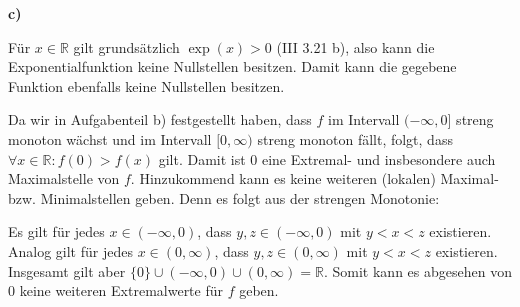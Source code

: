 \documentclass[a4paper,graphics,11pt]{article}
\begin{document}
\textbf{c)}

Für $x \in \mathbb{R}$ gilt grundsätzlich $\exp(x) > 0$ (III 3.21 b), also kann die
Exponentialfunktion keine Nullstellen besitzen. Damit kann die gegebene Funktion
ebenfalls keine Nullstellen besitzen.

Da wir in Aufgabenteil b) festgestellt haben, dass $f$ im Intervall $(-\infty, 0]$
streng monoton wächst und im Intervall $[0, \infty)$ streng monoton fällt, folgt,
dass $\forall x \in \mathbb{R}\colon f(0) > f(x)$ gilt. Damit ist 0 eine Extremal-
und insbesondere auch Maximalstelle von $f$. Hinzukommend kann es keine weiteren
(lokalen) Maximal- bzw. Minimalstellen geben. Denn es folgt aus der strengen Monotonie:

Es gilt für jedes $x \in (-\infty, 0)$, dass $y, z \in (-\infty, 0)$ mit $y<x<z$ existieren.
Analog gilt für jedes $x \in (0, \infty)$, dass $y,z \in (0, \infty)$ mit
$y<x<z$ existieren.\\
Insgesamt gilt aber $\{0\}\cup(-\infty,0)\cup(0,\infty) = \mathbb{R}$.
Somit kann es abgesehen von 0 keine weiteren Extremalwerte für $f$ geben.
\end{document}
